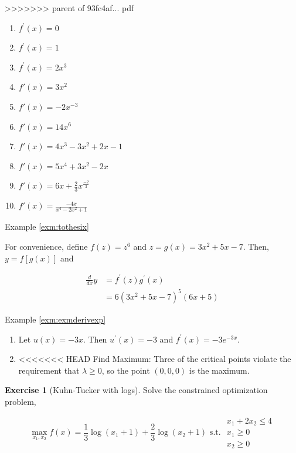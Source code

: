 \documentclass[]{book}
\providecommand{\tightlist}{%
  \setlength{\itemsep}{0pt}\setlength{\parskip}{0pt}}
\theoremstyle{definition}
\theoremstyle{definition}
\theoremstyle{definition}
\newtheorem{exercise}{Exercise}[chapter]
\theoremstyle{remark}
\begin{document}
{}
>>>>>>> parent of 93fc4af... pdf

\begin{enumerate}
\def\labelenumi{\arabic{enumi}.}
\tightlist
\item
  \(f^\prime(x)= 0\)
\item
  \(f^\prime(x)= 1\)
\item
  \(f^\prime(x)= 2x^3\)
\item
  \(f\prime(x)= 3x^2\)
\item
  \(f\prime(x)= -2x^{-3}\)
\item
  \(f\prime(x)= 14x^6\)
\item
  \(f\prime(x) = 4x^3 - 3x^2 + 2x -1\)
\item
  \(f\prime(x) = 5x^4 + 3x^2 - 2x\)
\item
  \(f\prime(x) = 6x + \frac{2}{3}x^{\frac{-2}{3}}\)
\item
  \(f\prime(x)= \frac{-4x}{x^4 - 2x^2 + 1}\)
\end{enumerate}

Example \ref{exm:tothesix}

{}For convenience, define \(f(z) = z^6\) and \(z = g(x) = 3x^2+5x-7\). Then, \(y=f[g(x)]\) and

\begin{align*}
\frac{d}{dx}y&= f^\prime(z) g^\prime(x) \\
&= 6(3x^2+5x-7)^5 (6x + 5)
\end{align*}

Example \ref{exm:exmderivexp}

{}

\begin{enumerate}
\def\labelenumi{\arabic{enumi}.}
\tightlist
\item
  Let \(u(x)=-3x\). Then \(u^\prime(x)=-3\) and \(f^\prime(x)=-3e^{-3x}\).
\item
<<<<<<< HEAD
  Find Maximum:
  Three of the critical points violate the requirement that \(\lambda \geq 0\), so the point \((0,0,0)\) is the maximum.
\end{enumerate}

\begin{exercise}[Kuhn-Tucker with logs]
\protect\hypertarget{exr:unnamed-chunk-64}{}{\label{exr:unnamed-chunk-64} {} }Solve the constrained optimization problem,

\[\max_{x_1,x_2} f(x) = \frac{1}{3}\log (x_1 + 1) + \frac{2}{3}\log (x_2 + 1) \text{ s.t. }  
\begin{array}{l}
x_1 + 2x_2 \leq 4\\
     x_1 \geq 0\\
    x_2 \geq 0
\end{array}\]
\end{exercise}
\end{document}

